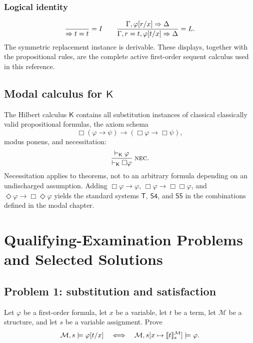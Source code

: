 \documentclass[11pt,oneside,openany]{book}
\theoremstyle{definition}
\theoremstyle{plain}
\theoremstyle{remark}
\DeclarePairedDelimiter{\sem}{\llbracket}{\rrbracket}
\newcommand{\Meta}{\mathcal{M}}
\newcommand{\entails}{\models}
\newcommand{\derives}{\vdash}
\newcommand{\K}{\mathsf{K}}
\newcommand{\Sfour}{\mathsf{S4}}
\newcommand{\Sfive}{\mathsf{S5}}
\newcommand{\Rule}[3][]{\frac{#2}{#3}\;\textsc{#1}}
\begin{document}
\subsection*{Logical identity}
\[
\Rule[\(=I\)]{}{\Rightarrow t=t}
\qquad
\Rule[\(=L\)]{\Gamma,\varphi[r/x]\Rightarrow\Delta}
{\Gamma,r=t,\varphi[t/x]\Rightarrow\Delta}.
\]
The symmetric replacement instance is derivable.  These displays, together
with the propositional rules, are the complete active first-order sequent
calculus used in this reference.

\section[Modal calculus for K]{Modal calculus for \(\K\)}
\label{sec:rule-sheets-03}

The Hilbert calculus \(\K\) contains all substitution instances of classical
classically valid propositional formulas, the axiom schema
\[
  \Box(\varphi\to\psi)\to(\Box\varphi\to\Box\psi),
\]
modus ponens, and necessitation:
\[
  \Rule[nec]{\derives_{\K}\varphi}{\derives_{\K}\Box\varphi}.
\]
Necessitation applies to theorems, not to an arbitrary formula depending on an
undischarged assumption.  Adding \(\Box\varphi\to\varphi\),
\(\Box\varphi\to\Box\Box\varphi\), and
\(\Diamond\varphi\to\Box\Diamond\varphi\) yields the standard systems
\(\mathsf T\), \(\Sfour\), and \(\Sfive\) in the combinations defined in the
modal chapter.

\chapter{Qualifying-Examination Problems and Selected Solutions}
\label{ch:qualifying-problems}
\label{app:qualifying}

\section{Problem 1: substitution and satisfaction}
\label{sec:qualifying-problems-01}
\label{prob:substitution}

Let \(\varphi\) be a first-order formula, let \(x\) be a variable, let
\(t\) be a term, let
\(\Meta\) be a structure, and let \(s\) be a variable assignment.  Prove
\[
  \Meta,s\entails\varphi[t/x]
  \quad\Longleftrightarrow\quad
  \Meta,s[x\mapsto\sem{t}^{\Meta}_s]\entails\varphi.
\]
\end{document}
